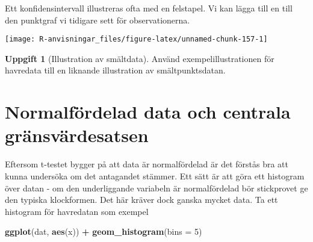 \documentclass[
]{book}
\newenvironment{Shaded}{\begin{snugshade}}{\end{snugshade}}
\newcommand{\AttributeTok}[1]{\textcolor[rgb]{0.13,0.29,0.53}{#1}}
\newcommand{\DecValTok}[1]{\textcolor[rgb]{0.00,0.00,0.81}{#1}}
\newcommand{\FloatTok}[1]{\textcolor[rgb]{0.00,0.00,0.81}{#1}}
\newcommand{\FunctionTok}[1]{\textcolor[rgb]{0.13,0.29,0.53}{\textbf{#1}}}
\newcommand{\NormalTok}[1]{#1}
\newcommand{\OtherTok}[1]{\textcolor[rgb]{0.56,0.35,0.01}{#1}}
\newcommand{\SpecialCharTok}[1]{\textcolor[rgb]{0.81,0.36,0.00}{\textbf{#1}}}
\newcommand{\StringTok}[1]{\textcolor[rgb]{0.31,0.60,0.02}{#1}}
\theoremstyle{definition}
\theoremstyle{definition}
\theoremstyle{definition}
\newtheorem{exercise}{Uppgift}[chapter]
\theoremstyle{definition}
\theoremstyle{remark}
\begin{document}
Ett konfidensintervall illustreras ofta med en felstapel. Vi kan lägga till en till den punktgraf vi tidigare sett för observationerna.

\begin{Shaded}
\end{Shaded}

\begin{center}\texttt{[image: R-anvisningar\_files/figure-latex/unnamed-chunk-157-1]} \end{center}

\begin{exercise}[Illustration av smältdata]
Använd exempelillustrationen för havredata till en liknande illustration av smältpunktsdatan.
\end{exercise}

\hypertarget{normalfuxf6rdelad-data-och-centrala-gruxe4nsvuxe4rdesatsen}{%
\section{Normalfördelad data och centrala gränsvärdesatsen}\label{normalfuxf6rdelad-data-och-centrala-gruxe4nsvuxe4rdesatsen}}

Eftersom t-testet bygger på att data är normalfördelad är det förstås bra att kunna undersöka om det antagandet stämmer. Ett sätt är att göra ett histogram över datan - om den underliggande variabeln är normalfördelad bör stickprovet ge den typiska klockformen. Det här kräver dock ganska mycket data. Ta ett histogram för havredatan som exempel

\begin{Shaded}
\begin{Highlighting}[]
\FunctionTok{ggplot}\NormalTok{(dat, }\FunctionTok{aes}\NormalTok{(x)) }\SpecialCharTok{+} \FunctionTok{geom\_histogram}\NormalTok{(}\AttributeTok{bins =} \DecValTok{5}\NormalTok{)}
\end{Highlighting}
\end{Shaded}
\end{document}
